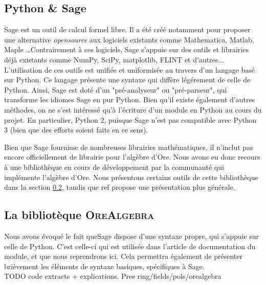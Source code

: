 \documentclass[12pt]{article}
\begin{document}
    \subsection{Python \& Sage}
        \label{sec:sage}
        \par Sage est un outil de calcul formel libre.
        Il a été créé notamment pour proposer
        une alternative \textit{opensource} aux logiciels existants comme Mathematica,
        Matlab, Maple \ldots Contrairement à ces logiciels, Sage s'appuie sur des outils
        et librairies déjà existants comme NumPy, SciPy, matplotlib, FLINT et d'autres...
        L'utilisation de ces outils est unifiée et uniformisée au travers d'un langage
        basé sur Python. Ce langage présente une syntaxe qui diffère légérement de celle
        de Python. Ainsi, Sage est doté d'un "pré-analyseur" ou "pré-parseur",
        qui transforme les idiomes Sage en pur Python.
        Bien qu'il existe également d'autres méthodes, on ne s'est intéressé qu'à l'écriture
        d'un module en Python au cours du projet.
        En particulier, Python 2, puisque Sage n'est pas compatible avec Python 3
        (bien que des efforts soient faits en ce sens).
        \par Bien que Sage fournisse de nombreuses librairies mathématiques,
        il n'inclut pas encore officiellement de librairie pour l'algèbre d'Ore.
        Nous avons eu donc recours à une bibliothèque en cours de développement par
        la communauté qui implémente l'algèbre d'Ore. Nous présentons certains outils
        de cette bibliothèque
        dans la section \ref{sec:libore}, tandis que {\color{red} ref} propose une
        présentation plus générale.
    \subsection{La bibliotèque \textsc{OreAlgebra}}
        \label{sec:libore}
        \par Nous avons évoqué le fait queSage dispose d'une syntaxe propre, qui s'appuie
        sur celle de Python.
        C'est celle-ci qui est utilisée dans l'article de documentation du module, et que nous
        reprendrons ici. Cela permettra également de présenter brièvement les éléments de syntaxe
        basiques, spécifiques à Sage.\\
        {\color{red} TODO code extracts + explications. Pres ring/fields/pols/orealgebra}

\end{document}
